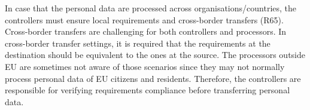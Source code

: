 In case that the personal data are processed across organisations/countries, the controllers must ensure local requirements and cross-border transfers (R65). Cross-border transfers are challenging for both controllers and processors. In cross-border transfer settings, it is required that the requirements at the destination should be equivalent to the ones at the source. The processors outside EU are sometimes not aware of those scenarios since they may not normally process personal data of EU citizens and residents. Therefore, the controllers are responsible for verifying requirements compliance before transferring personal data.

 \\
